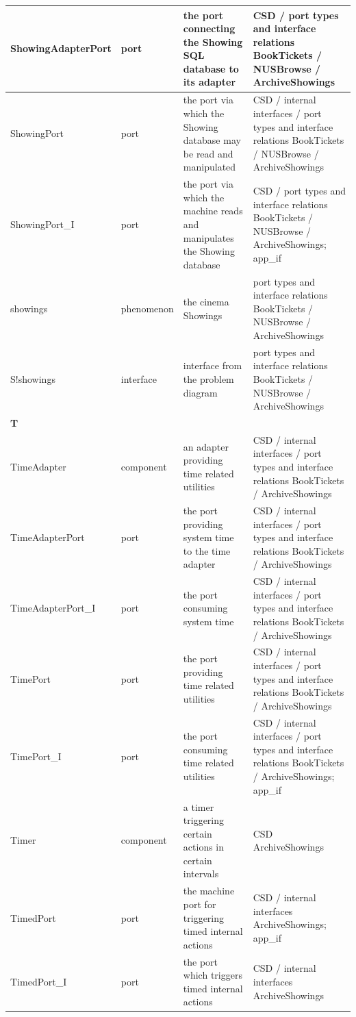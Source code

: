 \documentclass[a4paper,10pt,titlepage,bibtotoc,bibtotocnumbered]{scrreprt}
\begin{document}
\begin{longtable}{|p{.4\linewidth}|p{.2\linewidth}|p{.2\linewidth}|p{.2\linewidth}|}
ShowingAdapterPort & port & the port connecting the Showing SQL database to its adapter & CSD / port types and interface relations BookTickets / NUSBrowse / ArchiveShowings\\
\hline
ShowingPort & port & the port via which the Showing database may be read and manipulated & CSD / internal interfaces / port types and interface relations BookTickets / NUSBrowse / ArchiveShowings\\
\hline
ShowingPort\_I & port & the port via which the machine reads and manipulates the Showing database & CSD / port types and interface relations BookTickets / NUSBrowse / ArchiveShowings; app\_if\\
\hline
showings & phenomenon & the cinema Showings & port types and interface relations BookTickets / NUSBrowse / ArchiveShowings\\
\hline
S!{showings} & interface & interface from the problem diagram & port types and interface relations BookTickets / NUSBrowse / ArchiveShowings\\
\hline
\multicolumn{4}{|l|}{\textbf{T}}\\
\hline
TimeAdapter & component & an adapter providing time related utilities & CSD / internal interfaces / port types and interface relations BookTickets / ArchiveShowings\\
\hline
TimeAdapterPort & port & the port providing system time to the time adapter & CSD / internal interfaces / port types and interface relations BookTickets / ArchiveShowings\\
\hline
TimeAdapterPort\_I & port & the port consuming system time & CSD / internal interfaces / port types and interface relations BookTickets / ArchiveShowings\\
\hline
TimePort & port & the port providing time related utilities & CSD / internal interfaces / port types and interface relations BookTickets / ArchiveShowings\\
\hline
TimePort\_I & port & the port consuming time related utilities & CSD / internal interfaces / port types and interface relations BookTickets / ArchiveShowings; app\_if\\
\hline
Timer & component & a timer triggering certain actions in certain intervals & CSD ArchiveShowings\\
\hline
TimedPort & port & the machine port for triggering timed internal actions & CSD / internal interfaces ArchiveShowings; app\_if\\
\hline
TimedPort\_I & port & the port which triggers timed internal actions & CSD / internal interfaces ArchiveShowings\\

\end{longtable}
\end{document}
